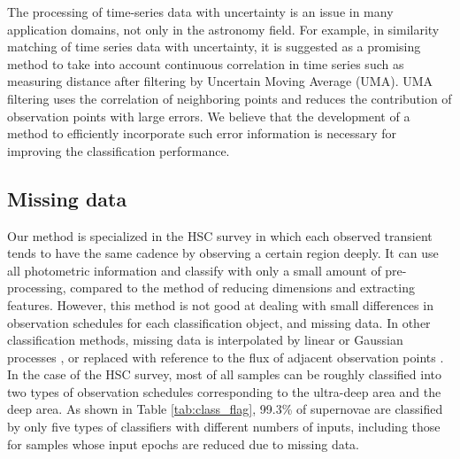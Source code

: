 \documentclass[useamsfonts]{pasj01}
\begin{document}
The processing of time-series data with uncertainty is an issue in many application domains, not only in the astronomy field.
For example, in similarity matching of time series data with uncertainty, it is suggested as a promising method to take into account continuous correlation in time series such as measuring distance after filtering by Uncertain Moving Average (UMA)\citep{Dallachiesa_2012}.
UMA filtering uses the correlation of neighboring points and reduces the contribution of observation points with large errors.
We believe that the development of a method to efficiently incorporate such error information is necessary for improving the classification performance.
%
\subsection{Missing data}
%
Our method is specialized in the HSC survey in which each observed transient tends to have the same cadence by observing a certain region deeply.
It can use all photometric information and classify with only a small amount of pre-processing, compared to the method of reducing dimensions and extracting features. 
However, this method is not good at dealing with small differences in observation schedules for each classification object, and missing data.
In other classification methods, missing data is interpolated by linear or Gaussian processes \citep{lockner16a,Muthukrishna_2019}, or replaced with reference to the flux of adjacent observation points \citep{charnock17a}.
In the case of the HSC survey, most of all samples can be roughly classified into two types of observation schedules corresponding to the ultra-deep area and the deep area.
As shown in Table \ref{tab:class_flag}, 99.3\% of supernovae are classified by only five types of classifiers with different numbers of inputs, including those for samples whose input epochs are reduced due to missing data.
%
\end{document}
